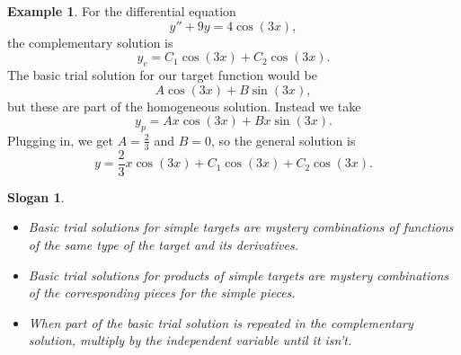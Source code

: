 \documentclass[12pt]{amsart}
\numberwithin{equation}{section}
\theoremstyle{plain} %
\newtheorem{slogan}[equation]{Slogan}
\newcommand{\rsa}{\rightsquigarrow}
\theoremstyle{definition}
\newtheorem{ex}[equation]{Example}
\theoremstyle{remark}
\begin{document}
\begin{ex} For the differential equation
\[ y'' + 9y = 4 \cos(3x),\]
the complementary solution is 
\[ y_c= C_1 \cos(3x) + C_2 \cos(3x).\]
The basic trial solution for our target function would be
\[ A \cos(3x) + B\sin(3x),\]
but these are part of the homogeneous solution. Instead we take
\[ y_p = A x \cos(3x) + B x \sin(3x).\]
Plugging in, we get $A=\frac{2}{3}$ and $B=0$, so the general solution is
\[ y= \frac{2}{3} x \cos(3x) + C_1 \cos(3x) + C_2 \cos(3x).\]
\end{ex}

\begin{slogan}
\begin{itemize}
\item Basic trial solutions for simple targets are mystery combinations of functions of the same type of the target and its derivatives.
\item Basic trial solutions for products of simple targets are mystery combinations of the corresponding pieces for the simple pieces.
\item When part of the basic trial solution is repeated in the complementary solution, multiply by the independent variable until it isn't.
\end{itemize}
\end{slogan}
\end{document}
